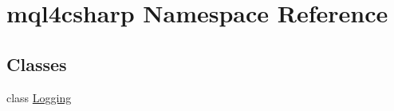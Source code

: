 \hypertarget{namespacemql4csharp}{}\section{mql4csharp Namespace Reference}
\label{namespacemql4csharp}
\subsection*{Classes}
\begin{DoxyCompactItemize}
\item 
class \hyperlink{classmql4csharp_1_1_logging}{Logging}
\end{DoxyCompactItemize}

